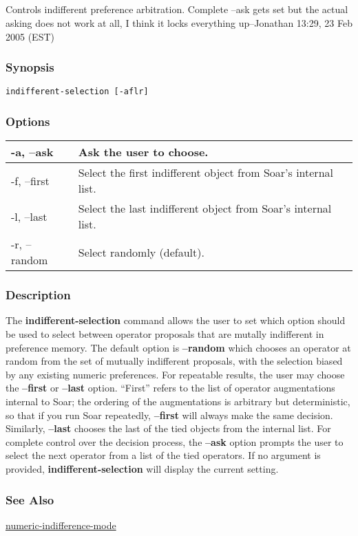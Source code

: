 \subsection{}
\label{indifferent-selection}
Controls indifferent preference arbitration. 
 Complete --ask gets set but the actual asking does not work at all, I think it locks everything up--Jonathan 13:29, 23 Feb 2005 (EST) 
\subsubsection*{Synopsis}
\begin{verbatim}
indifferent-selection [-aflr]
\end{verbatim}
\subsubsection*{Options}
\begin{tabular}{|l|l|}
\hline 
 -a, --ask  & Ask the user to choose.  \\
 \hline 
 -f, --first  & Select the first indifferent object from Soar's internal list.  \\
 \hline 
 -l, --last  & Select the last indifferent object from Soar's internal list.  \\
 \hline 
 -r, --random  & Select randomly (default).  \\
 \hline 
\end{tabular}
\subsubsection*{Description}
 The \textbf{indifferent-selection}
 command allows the user to set which option should be used to select between operator proposals that are mutally indifferent in preference memory. 
 The default option is \textbf{--random}
 which chooses an operator at random from the set of mutually indifferent proposals, with the selection biased by any existing numeric preferences. For repeatable results, the user may choose the \textbf{--first}
 or \textbf{--last}
 option. ``First'' refers to the list of operator augmentations internal to Soar; the ordering of the augmentations is arbitrary but deterministic, so that if you run Soar repeatedly, \textbf{--first}
 will always make the same decision. Similarly, \textbf{--last}
 chooses the last of the tied objects from the internal list. For complete control over the decision process, the \textbf{--ask}
 option prompts the user to select the next operator from a list of the tied operators. 
 If no argument is provided, \textbf{indifferent-selection}
 will display the current setting. 
\subsubsection*{See Also}
\hyperref[numeric-indifference-mode]{numeric-indifference-mode} 